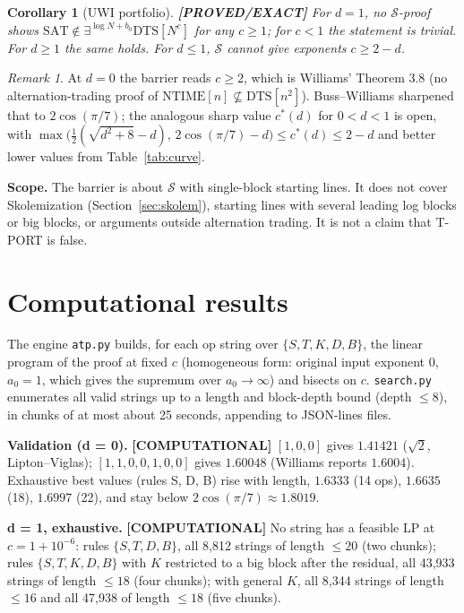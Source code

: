 \documentclass[11pt]{article}
\newtheorem{corollary}[theorem]{Corollary}
\theoremstyle{definition}
\theoremstyle{remark}
\newtheorem*{remark}{Remark}
\newcommand{\DTS}{\mathrm{DTS}}
\newcommand{\NTIME}{\mathrm{NTIME}}
\newcommand{\SAT}{\mathrm{SAT}}
\newcommand{\status}[1]{\textbf{[#1]}}
\begin{document}
\begin{corollary}[UWI portfolio] \status{PROVED/EXACT}
For $d=1$, no $\mathcal S$-proof shows $\SAT\notin\exists^{\log N+b_0}\DTS[N^c]$ for any $c\ge1$; for $c<1$ the
statement is trivial. For $d\ge1$ the same holds. For $d\le1$, $\mathcal S$ cannot give exponents
$c\ge2-d$.
\end{corollary}

\begin{remark}
At $d=0$ the barrier reads $c\ge2$, which is Williams' Theorem 3.8 (no alternation-trading proof of
$\NTIME[n]\not\subseteq\DTS[n^2]$). Buss--Williams sharpened that to $2\cos(\pi/7)$; the analogous sharp
value $c^*(d)$ for $0<d<1$ is open, with
$\max\bigl(\tfrac12(\sqrt{d^2+8}-d),\,2\cos(\pi/7)-d\bigr)\le c^*(d)\le 2-d$ and better lower values from
Table~\ref{tab:curve}.
\end{remark}

\noindent\textbf{Scope.} The barrier is about $\mathcal S$ with single-block starting lines. It does not
cover Skolemization (Section~\ref{sec:skolem}), starting lines with several leading log blocks or big
blocks, or arguments outside alternation trading. It is not a claim that T-PORT is false.

\section{Computational results}

The engine \texttt{atp.py} builds, for each op string over $\{S,T,K,D,B\}$, the linear program of the
proof at fixed $c$ (homogeneous form: original input exponent 0, $a_0=1$, which gives the supremum over
$a_0\to\infty$) and bisects on $c$. \texttt{search.py} enumerates all valid strings up to a length and
block-depth bound (depth $\le8$), in chunks of at most about 25 seconds, appending to JSON-lines files.

\noindent\textbf{Validation (d = 0).} \status{COMPUTATIONAL}
$[1,0,0]$ gives $1.41421$ ($\sqrt2$, Lipton--Viglas); $[1,1,0,0,1,0,0]$ gives $1.60048$ (Williams reports
$1.6004$). Exhaustive best values (rules S, D, B) rise with length, $1.6333$ (14 ops), $1.6635$ (18),
$1.6997$ (22), and stay below $2\cos(\pi/7)\approx1.8019$.

\noindent\textbf{d = 1, exhaustive.} \status{COMPUTATIONAL}
No string has a feasible LP at $c=1+10^{-6}$:
rules $\{S,T,D,B\}$, all 8,812 strings of length $\le20$ (two chunks);
rules $\{S,T,K,D,B\}$ with $K$ restricted to a big block after the residual, all 43,933 strings of
length $\le18$ (four chunks); with general $K$, all 8,344 strings of length $\le16$ and all 47,938 of
length $\le18$ (five chunks).
\end{document}
